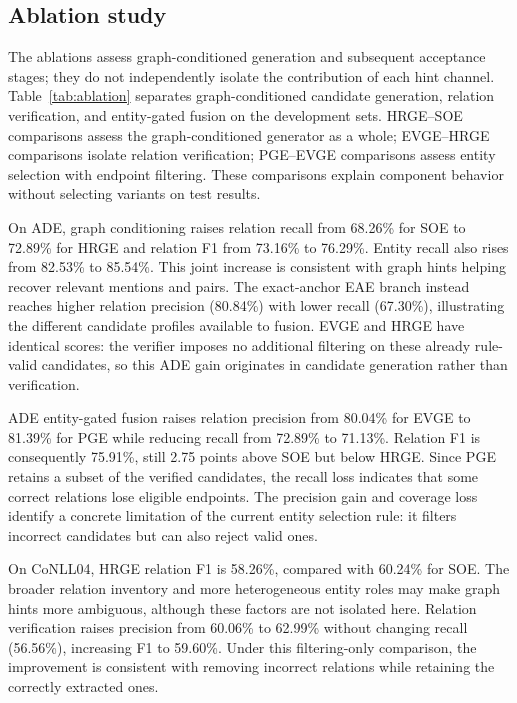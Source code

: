 \documentclass[a4paper,fleqn,numbers,doubleblind]{cas-dc}
\begin{document}
\begin{table}[t]
\centering\small\setlength{\tabcolsep}{4pt}
\caption{Test stability across two additional training repetitions under the common strict-span
evaluator (micro \%, mean $\pm$ sample standard deviation; $n=2$). The final
column is the mean PGE-minus-SOE relation-F1 difference.}
\label{tab:repeated-runs}

\end{table}

\subsection{Ablation study}
The ablations assess graph-conditioned generation and subsequent acceptance
stages; they do not independently isolate the contribution of each hint channel.
Table~\ref{tab:ablation} separates graph-conditioned candidate generation,
relation verification, and entity-gated fusion on the development sets.
HRGE--SOE comparisons assess the graph-conditioned generator as a whole;
EVGE--HRGE comparisons isolate relation verification; PGE--EVGE comparisons
assess entity selection with endpoint filtering. These comparisons explain
component behavior without selecting variants on test results.

On ADE, graph conditioning raises relation recall from 68.26\% for SOE to
72.89\% for HRGE and relation F1 from 73.16\% to 76.29\%. Entity recall also
rises from 82.53\% to 85.54\%. This joint increase is consistent with graph
hints helping recover relevant mentions and pairs. The exact-anchor EAE
branch instead reaches higher relation precision (80.84\%) with lower recall
(67.30\%), illustrating the different candidate profiles available to fusion.
EVGE and HRGE have identical scores: the verifier imposes no additional
filtering on these already rule-valid candidates, so this ADE gain originates
in candidate generation rather than verification.

ADE entity-gated fusion raises relation precision from 80.04\% for EVGE to
81.39\% for PGE while reducing recall from 72.89\% to 71.13\%. Relation F1
is consequently 75.91\%, still 2.75 points above SOE but below HRGE. Since
PGE retains a subset of the verified candidates, the recall loss indicates
that some correct relations lose eligible endpoints. The precision gain and
coverage loss identify a concrete limitation of the current entity selection
rule: it filters incorrect candidates but can also reject valid ones.

On CoNLL04, HRGE relation F1 is 58.26\%, compared with 60.24\% for SOE.
The broader relation inventory and more heterogeneous entity roles may make
graph hints more ambiguous, although these factors are not isolated here.
Relation verification raises precision from 60.06\% to 62.99\% without
changing recall (56.56\%), increasing F1 to 59.60\%. Under this filtering-only
comparison, the improvement is consistent with removing incorrect relations
while retaining the correctly extracted ones.
\end{document}
